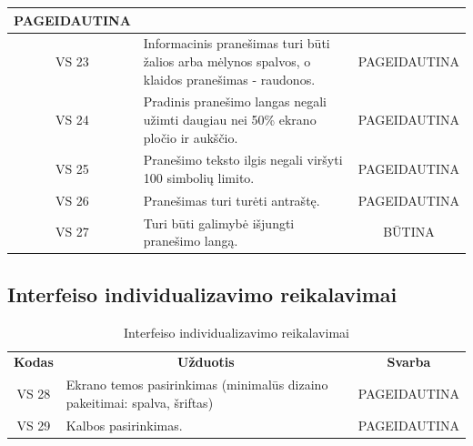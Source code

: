 \documentclass{VUMIFPSkursinis}
\begin{document}
{{{{{\begin{center}
\begin{table}[H]
\begin{tabular}{|p{2cm}|p{11cm}|p{2cm}|}
		\multicolumn{1}{|p{1.5cm}|}{PAGEIDAUTINA}\\
	\hline
		\multicolumn{1}{|c|}{VS 23}&
		\multicolumn{1}{|p{12,5cm}|}{Informacinis pranešimas turi būti žalios arba mėlynos spalvos, o klaidos pranešimas - raudonos.}& 
		\multicolumn{1}{|p{1.5cm}|}{PAGEIDAUTINA}\\
	\hline
		\multicolumn{1}{|c|}{VS 24}&
		\multicolumn{1}{|p{12,5cm}|}{Pradinis pranešimo langas negali užimti daugiau nei 50\% ekrano pločio ir aukščio.}& 
		\multicolumn{1}{|p{1.5cm}|}{PAGEIDAUTINA}\\
	\hline
		\multicolumn{1}{|c|}{VS 25}&
		\multicolumn{1}{|p{12,5cm}|}{Pranešimo teksto ilgis negali viršyti 100 simbolių limito.}& 
		\multicolumn{1}{|p{1.5cm}|}{PAGEIDAUTINA}\\
	\hline
		\multicolumn{1}{|c|}{VS 26}&
		\multicolumn{1}{|p{12,5cm}|}{Pranešimas turi turėti antraštę.}& 
		\multicolumn{1}{|p{1.5cm}|}{PAGEIDAUTINA}\\
	\hline
		\multicolumn{1}{|c|}{VS 27}&
		\multicolumn{1}{|p{12,5cm}|}{Turi būti galimybė išjungti pranešimo langą.}& 
		\multicolumn{1}{|c|}{BŪTINA}\\
	\hline	 	
	
	\end{tabular}
	
	\label{table:5}
	\end{table}

\end{center}

\pagebreak

\subsection{Interfeiso individualizavimo reikalavimai}

\begin{center}
	\begin{table}[H]
	\caption{Interfeiso individualizavimo reikalavimai}
	\begin{tabular}{|p{2cm}|p{13cm}|p{2cm}|}
	\hline
	    \rowcolor{lightgray}
	    \multicolumn{3}{|c|}{Interfeiso individualizavimo reikalavimai}\\
	\hline
		\multicolumn{1}{|c|}{ {\bfseries Kodas}}&
		\multicolumn{1}{|c|}{ {\bfseries Užduotis}}&
		\multicolumn{1}{|c|}{{\bfseries Svarba}}\\		
	\hline
		\multicolumn{1}{|c|}{VS 28}&
		\multicolumn{1}{|p{12,9cm}|}{Ekrano temos pasirinkimas (minimalūs dizaino pakeitimai: spalva, šriftas)}& 
		\multicolumn{1}{|p{1.5cm}|}{PAGEIDAUTINA}\\
	\hline
		\multicolumn{1}{|c|}{VS 29}&
		\multicolumn{1}{|p{12,9cm}|}{Kalbos pasirinkimas.}& 
		\multicolumn{1}{|p{1.5cm}|}{PAGEIDAUTINA}\\
	\hline
	

\end{tabular}
\end{table}
\end{center}}}}}}
\end{document}

